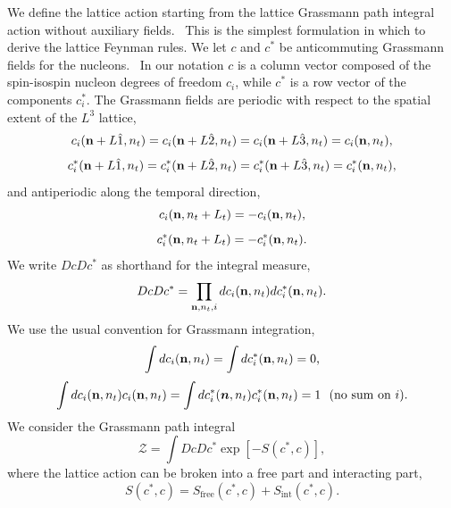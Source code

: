 We define the lattice action starting from the lattice Grassmann path integral
action without auxiliary fields.
\ This
is the simplest formulation in which to derive the lattice Feynman rules.
 We let $c$ and $c^*$ be anticommuting Grassmann fields for the nucleons.
\ In our notation $c$ is a column vector composed of the spin-isospin nucleon
degrees of freedom $c_i$, while $c^*$ is a row vector of the components
$c^*_i$.  The Grassmann fields are periodic with respect to
the spatial extent of the $L^{3}$ lattice,%
\begin{equation}
c_i({\bf n}+L\hat{1},n_t)=c_i({\bf n}+L\hat{2},n_t)=c_i({\bf n}+L\hat{3},n_t)=c_i({\bf n},n_t),
\end{equation}%
\begin{equation}
c_i^{\ast}({\bf n}+L\hat{1},n_t)=c_i^{\ast}({\bf n}+L\hat{2}%
,n_t)=c_i^{\ast}({\bf n}+L\hat{3},n_t)=c_i^{\ast}({\bf n},n_t),
\end{equation}
and antiperiodic along the temporal direction,%
\begin{equation}
c_i({\bf n},n_t+L_{t})=-c_i({\bf n},n_t),
\end{equation}%
\begin{equation}
c_i^{\ast}({\bf n},n_t+L_{t})=-c_i^{\ast}({\bf n},n_t).
\end{equation}
We write $DcDc^{\ast}$ as shorthand for the integral measure,%
\begin{equation}
DcDc^{\ast}=\prod_{{\bf n},n_t,i}dc_{i}({\bf n}%
,n_t)dc_{i}^{\ast}({\bf n},n_t).
\end{equation}
We use the usual convention for Grassmann integration,%
\begin{equation}
\int dc_{i}({\bf n},n_t)=\int dc_{i}^{\ast}({\bf n},n_t)=0\text{,}%
\end{equation}%
\begin{equation}
\int dc_{i}({\bf n},n_t)c_{i}({\bf n},n_t)=\int dc_{i}^{\ast}(\vec
{n},n_t)c_{i}^{\ast}({\bf n},n_t)=1\text{ \ (no sum on }i\text{)}.
\end{equation}
We consider the Grassmann path integral%
\begin{equation}
\mathcal{Z}=\int DcDc^{\ast}\exp\left[  -S\left(c^{\ast},c\right)  \right]
, \label{defining_Z}%
\end{equation}
where the lattice action can be broken into a free part and interacting part,
\begin{equation}
S(c^*,c)=S_{\text{free}}(c^{\ast},c)+S_\text{int}(c^{\ast},c).
\label{path_nonaux}%
\end{equation}
